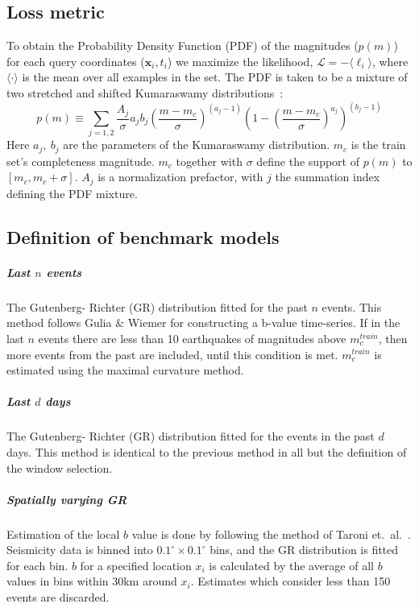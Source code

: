 \documentclass[pdflatex]{sn-jnl}
\begin{document}
\subsection{Loss metric}
To obtain the Probability Density Function (PDF) of the magnitudes ($p(m)$) for each query coordinates ($\textbf{x}_i, t_i$) we maximize the likelihood, $\mathcal{L} = -\langle \ell_i \rangle$, where $\langle \cdot\rangle$ is the mean over all examples in the set. The PDF is taken to be a mixture of two stretched and shifted Kumaraswamy distributions~\cite{kumaraswamy_generalized_1980}:
\begin{equation}
    p\left( m \right)
    \equiv
    \sum_{j=1,2} \frac{A_j}{\sigma}a_jb_j\left(\frac{m-m_c}{\sigma}\right)^{\left(a_j-1\right)}\left(1-\left(\frac{m-m_c}{\sigma}\right)^{a_j}\right)^{\left(b_j-1\right)}
\end{equation}
Here $a_j, \ b_j$ are the parameters of the Kumaraswamy distribution. $m_c$ is the train set's completeness magnitude. $m_c$ together with $\sigma$ define the support of $p(m)$ to $[m_c, m_c+\sigma]$. $A_j$ is a normalization prefactor, with $j$ the summation index defining the PDF mixture.

\subsection{Definition of benchmark models}
\subparagraph{Last $n$ events} The Gutenberg- Richter (GR) distribution fitted for the past $n$ events. This method follows Gulia \& Wiemer\cite{gulia_real-time_2019} for constructing a b-value time-series. If in the last $n$ events there are less than 10 earthquakes of magnitudes above $m_c^{train}$, then more events from the past are included, until this condition is met. $m_c^{train}$ is estimated using the maximal curvature method\cite{wiemer_minimum_2000}.

\subparagraph{Last $d$ days} The Gutenberg- Richter (GR) distribution fitted for the events in the past $d$ days. This method is identical to the previous method in all but the definition of the window selection.

\subparagraph{Spatially varying GR} Estimation of the local $b$ value is done by following the method of Taroni et.~al.~\cite{taroni_highdefinition_2021}. Seismicity data is 
binned into $0.1^\circ \times 0.1^\circ$ bins, and the GR distribution is fitted for each bin. $b$ for a specified location $x_i$ is calculated by the average of all $b$ values in bins within 30km around $x_i$. Estimates which consider less than 150 events are discarded.
\end{document}
